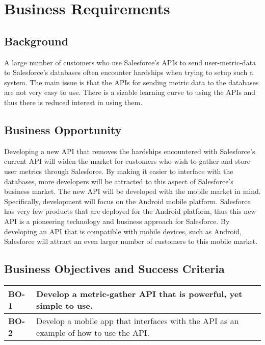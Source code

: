 \documentclass[12pt,oneside,letterpaper]{article}
\begin{document}
\newpage

\section{Business Requirements}
\subsection{Background}
A large number of customers who use Salesforce's APIs to send user-metric-data to Salesforce's databases often encounter hardships when trying to setup such a system. The main issue is that the APIs for sending metric data to the databases are not very easy to use. There is a sizable learning curve to using the APIs and thus there is reduced interest in using them.

\subsection{Business Opportunity}
Developing a new API that removes the hardships encountered with Salesforce's current API will widen the market for customers who wish to gather and store user metrics through Salesforce. By making it easier to interface with the databases, more developers will be attracted to this aspect of Salesforce's business market. The new API will be developed with the mobile market in mind. Specifically, development will focus on the Android mobile platform. Salesforce has very few products that are deployed for the Android platform, thus this new API is a pioneering technology and business approach for Salesforce. By developing an API that is compatible with mobile devices, such as Android, Salesforce will attract an even larger number of customers to this mobile market.

\subsection{Business Objectives and Success Criteria}

\begin{tabular} {| p{1in} | p{4.5in} |}
\hline
\textbf{BO-1} & Develop a metric-gather API that is powerful, yet simple to use.\\

\hline
\textbf{BO-2} & Develop a mobile app that interfaces with the API as an example of how to use the API.\\*
\hline
\end{tabular}
\end{document}
